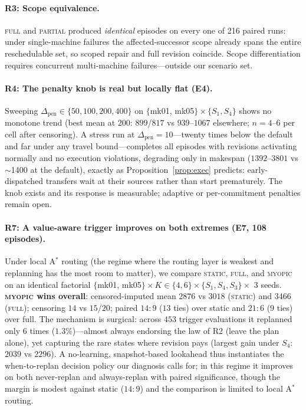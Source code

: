 \documentclass[twocolumn]{article}
\begin{document}
\paragraph{R3: Scope equivalence.}
\textsc{full} and \textsc{partial} produced \emph{identical} episodes
on every one of 216 paired runs: under single-machine failures the
affected-successor scope already spans the entire reschedulable set, so
scoped repair and full revision coincide. Scope differentiation requires
concurrent multi-machine failures---outside our scenario set.

\paragraph{R4: The penalty knob is real but locally flat (E4).}
Sweeping $\Delta_{\mathrm{pen}}\in\{50,100,200,400\}$ on
$\{$mk01, mk05$\}{\times}\{S_1,S_4\}$ shows no monotone trend
(best mean at $200$: $899$/$817$ vs $939$--$1067$ elsewhere;
$n{=}4$--$6$ per cell after censoring). A stress run at
$\Delta_{\mathrm{pen}}{=}10$---twenty times below the default and far
under any travel bound---completes all episodes with revisions
activating normally and no execution violations, degrading only in
makespan ($1392$--$3801$ vs $\sim$1400 at the default), exactly as
Proposition~\ref{prop:exec} predicts: early-dispatched transfers wait
at their sources rather than start prematurely. The knob exists and its
response is measurable; adaptive or per-commitment penalties remain
open.

\paragraph{R7: A value-aware trigger improves on both extremes (E7, 108
episodes).}
Under local A$^*$ routing (the regime where the routing layer is
weakest and replanning has the most room to matter), we compare
\textsc{static}, \textsc{full}, and \textsc{myopic} on an identical
factorial $\{$mk01, mk05$\}\times K\in\{4,6\}\times\{S_1,S_4,S_3\}
\times$ 3 seeds. \textbf{\textsc{myopic} wins overall}: censored-imputed
mean $2876$ vs $3018$ (\textsc{static}) and $3466$ (\textsc{full});
censoring $14$ vs $15$/$20$; paired $14{:}9$ ($13$ ties) over static and
$21{:}6$ ($9$ ties) over full. The mechanism is surgical: across $453$
trigger evaluations it replanned only $6$ times ($1.3\%$)---almost
always endorsing the law of R2 (leave the plan alone), yet capturing the
rare states where revision pays (largest gain under $S_4$: $2039$ vs
$2296$). A no-learning, snapshot-based lookahead thus instantiates the
when-to-replan decision policy our diagnosis calls for; in this regime
it improves on both never-replan and always-replan with paired
significance, though the margin is modest against static ($14{:}9$) and
the comparison is limited to local A$^*$ routing.
\end{document}
